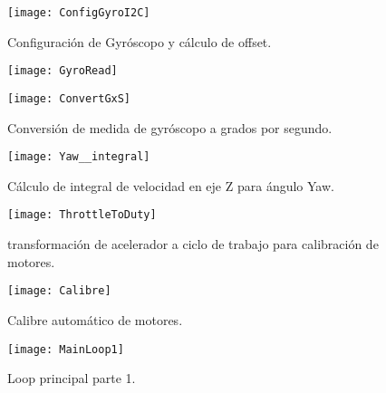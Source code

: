 \documentclass[../main.tex]{subfiles}
\begin{document}
\begin{landscape}
\begin{figure}
\begin{centering}
\texttt{[image: ConfigGyroI2C]}
\par\end{centering}
\caption{Configuración de Gyróscopo y cálculo de offset.}
\end{figure}

\begin{figure}
\begin{centering}
\texttt{[image: GyroRead]}
\par\end{centering}
\caption{}
\end{figure}

\begin{figure}
\begin{centering}
\texttt{[image: ConvertGxS]}
\par\end{centering}
\caption{Conversión de medida de gyróscopo a grados por segundo.}
\end{figure}

\begin{figure}
\begin{centering}
\texttt{[image: Yaw\_\_integral]}
\par\end{centering}
\caption{Cálculo de integral de velocidad en eje Z para ángulo Yaw.}
\end{figure}

\begin{figure}
\begin{centering}
\texttt{[image: ThrottleToDuty]}
\par\end{centering}
\caption{transformación de acelerador a ciclo de trabajo para calibración de motores.}
\end{figure}

\begin{figure}
\begin{centering}
\texttt{[image: Calibre]}
\par\end{centering}
\caption{Calibre automático de motores.}
\end{figure}

\begin{figure}
\begin{centering}
\texttt{[image: MainLoop1]}
\par\end{centering}
\caption{Loop principal parte 1.}
\end{figure}


\end{landscape}
\end{document}
